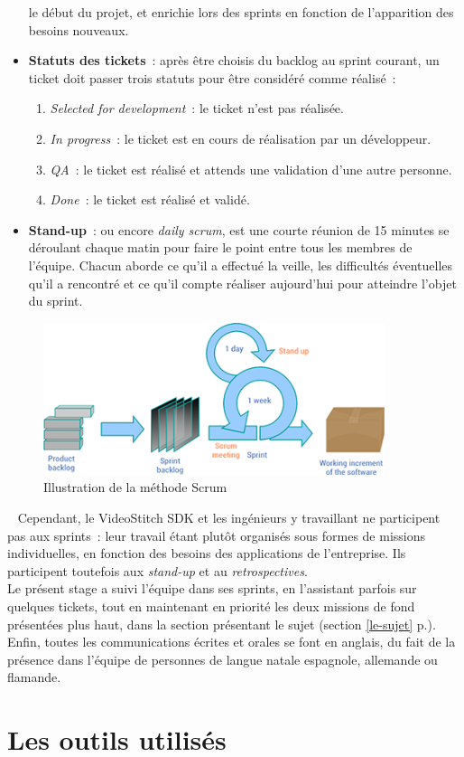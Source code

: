 \begin{itemize}
  le début du projet, et enrichie lors des sprints en fonction de l'apparition des besoins nouveaux.
  \item \textbf{Statuts des tickets}~: après être choisis du backlog au sprint courant, 
  un ticket doit passer trois statuts pour être considéré comme réalisé~:
    \begin{enumerate}
      \item \textit{Selected for development}~: le ticket n'est pas réalisée.
      \item \textit{In progress}~: le ticket est en cours de réalisation par un développeur.
      \item \textit{QA}~: le ticket est réalisé et attends une validation d'une autre personne.
      \item \textit{Done}~: le ticket est réalisé et validé. 
    \end{enumerate}
  \item \textbf{Stand-up}~: \label{stand-up} ou encore \textit{daily scrum}, est une courte réunion de 15 minutes
  se déroulant chaque matin pour faire le point entre tous les membres de l'équipe.
  Chacun aborde ce qu'il a effectué la veille, les difficultés éventuelles qu'il
  a rencontré et ce qu'il compte réaliser aujourd'hui pour atteindre l'objet du sprint.
\end{itemize}
\begin{figure}
  \centering
  \includegraphics[width=10cm]{images/scrum-process.png}
  \caption{Illustration de la méthode Scrum\cite{scrum-process}}
\end{figure}
\ \newline
Cependant, le VideoStitch SDK et les ingénieurs y travaillant ne participent pas
aux sprints~: leur travail étant plutôt organisés sous formes de missions individuelles,
en fonction des besoins des applications de l'entreprise. Ils participent toutefois 
aux \textit{stand-up} et au \textit{retrospectives}.\\
Le présent stage a suivi l'équipe dans ses sprints, en l'assistant parfois sur quelques
tickets, tout en maintenant en priorité les deux missions de fond présentées plus haut, dans 
la section présentant le sujet (section \ref{le-sujet} p.\pageref{le-sujet}).\\
\newline
Enfin, toutes les communications écrites et orales se font en anglais, du fait
de la présence dans l'équipe de personnes de langue natale espagnole, allemande ou flamande.

\section{Les outils utilisés}
